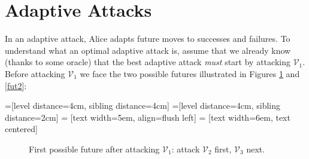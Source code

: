 \documentclass[11pt]{llncs}
\newcommand{\atk}{\begin{turn}{130}{\scriptsize \Lightning}\end{turn}}
\newcommand{\tk}{\raisebox{1ex}{\atk}}
\newcommand{\LL}[2]{\mbox{\tk $\mathcal{V}_{#1}$,~{\scriptsize \StopWatchEnd} #2}}
\begin{document}
\section{Adaptive Attacks}

In an adaptive attack, Alice adapts future moves to successes and failures. To understand what an optimal adaptive attack is, assume that we already know (thanks to some oracle) that the best adaptive attack {\sl must} start by attacking $\mathcal{V}_1$. Before attacking $\mathcal{V}_1$ we face the two possible futures illustrated in Figures \ref{fut1} and \ref{fut2}:

=[level distance=4cm, sibling distance=4cm]
=[level distance=4cm, sibling distance=2cm]
 = [text width=5em, align=flush left] %
 = [text width=6em, text centered] %

\begin{figure}[!h]
\begin{center}
\end{center}
\caption{First possible future after attacking $\mathcal{V}_1$: attack $\mathcal{V}_2$ first, $\mathcal{V}_3$ next.}
\label{fut1}
\end{figure}
\end{document}
